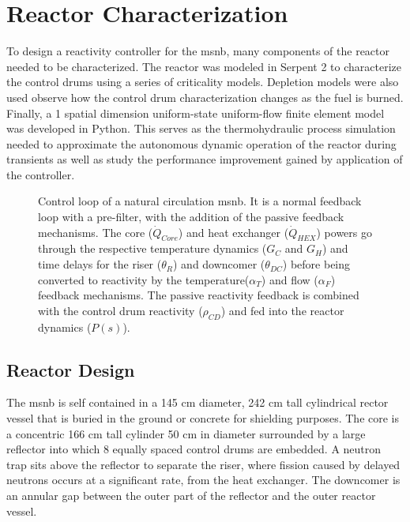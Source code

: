 \chapter{Reactor Characterization}
To design a reactivity controller for the \acl{msnb}, many components of the reactor needed to be characterized. The reactor was modeled in Serpent 2 to characterize the control drums using a series of criticality models. Depletion models were also used observe how the control drum characterization changes as the fuel is burned. Finally, a 1 spatial dimension uniform-state uniform-flow finite element model was developed in Python. This serves as the thermohydraulic process simulation needed to approximate the autonomous dynamic operation of the reactor during transients as well as study the performance improvement gained by application of the controller. 


\label{Chapter:Modeling}
\begin{figure}[!ht]
    \centering
    \resizebox{\textwidth}{!}{}
    \caption[Control loop of a natural circulation \acs{msnb}]{Control loop of a natural circulation \acs{msnb}. It is a normal feedback loop with a pre-filter, with the addition of the passive feedback mechanisms. The core ($\dot{Q}_{Core}$) and heat exchanger ($\dot{Q}_{HEX}$) powers go through the respective temperature dynamics ($G_C$ and $G_H$) and time delays for the riser ($\theta_R$) and downcomer ($\theta_{DC}$) before being converted to reactivity by the temperature($\alpha_T$) and flow ($\alpha_F$) feedback mechanisms. The passive reactivity feedback is combined with the control drum reactivity ($\rho_{CD}$) and fed into the reactor dynamics ($P(s)$).  }
    \label{fig:ReactorControlLoop}
\end{figure}


\section{Reactor Design}
The \acs{msnb} is self contained in a 145 cm diameter, 242 cm tall cylindrical rector vessel that is buried in the ground or concrete for shielding purposes. The core is a concentric 166 cm tall cylinder 50 cm in diameter surrounded by a large reflector into which 8 equally spaced control drums are embedded. A neutron trap sits above the reflector to separate the riser, where fission caused by delayed neutrons occurs at a significant rate, from the heat exchanger. The downcomer is an annular gap between the outer part of the reflector and the outer reactor vessel. 

